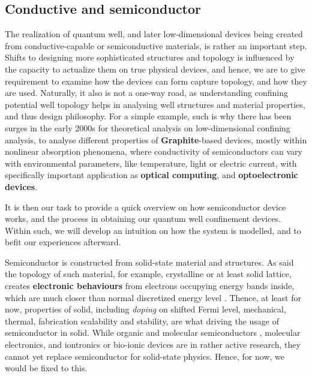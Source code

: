 \subsection{Conductive and semiconductor}

The realization of quantum well, and later low-dimensional devices being created from conductive-capable or semiconductive materials, is rather an important step. Shifts to designing more sophisticated structures and topology is influenced by the capacity to actualize them on true physical devices, and hence, we are to give requirement to examine how the devices can form capture topology, and how they are used. Naturally, it also is not a one-way road, as understanding confining potential well topology helps in analysing well structures and material properties, and thus design philosophy. For a simple example, such is why there has been surges in the early 2000s for theoretical analysis on low-dimensional confining analysis, to analyse different properties of \textbf{Graphite}-based devices, mostly within nonlinear absorption phenomena, where conductivity of semiconductors can vary with environmental parameters, like temperature, light or electric current, with specifically important application as \textbf{optical computing}, and \textbf{optoelectronic devices}. 

It is then our task to provide a quick overview on how semiconductor device works, and the process in obtaining our quantum well confinement devices. Within such, we will develop an intuition on how the system is modelled, and to befit our experiences afterward. 

Semiconductor is constructed from solid-state material and structures. As said the topology of such material, for example, crystalline or at least solid lattice, creates \textbf{electronic behaviours} from electrons occupying energy bands inside, which are much closer than normal discretized energy level \cite{huang2DSemiconductorsSpecific2022}. Thence, at least for now, properties of solid, including \textit{doping} on shifted Fermi level, mechanical, thermal, fabrication scalability and stability, are what driving the usage of semiconductor in solid. While organic and molecular semiconductors \cite{FACCHETTI200728}, molecular electronics, and iontronics or bio-ionic devices are in rather active research, they cannot yet replace semiconductor for solid-state physics. Hence, for now, we would be fixed to this. 

